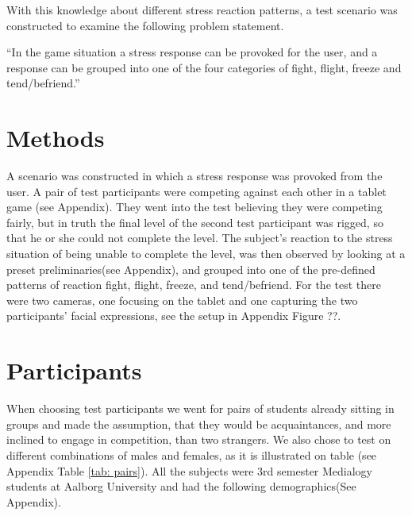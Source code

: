With this knowledge about different stress reaction patterns, a test scenario was constructed to examine the following problem statement.

“In the game situation a stress response can be provoked for the user, and a response can be grouped into one of the four categories of fight, flight, freeze and tend/befriend.”

\section{Methods}
A scenario was constructed in which a stress response was provoked from the user. A pair of test participants were competing against each other in a tablet game (see Appendix). They went into the test believing they were competing fairly, but in truth the final level of the second test participant was rigged, so that he or she could not complete the level. The subject’s reaction to the stress situation of being unable to complete the level, was then observed by looking at a preset preliminaries(see Appendix), and grouped into one of the pre-defined patterns of reaction fight, flight, freeze, and tend/befriend. For the test there were two cameras, one focusing on the tablet and one capturing the two participants’ facial expressions, see the setup in Appendix Figure ??. 

\section{Participants}
When choosing test participants we went for pairs of students already sitting in groups and made the assumption, that they would be acquaintances, and more inclined to engage in competition, than two strangers. We also chose to test on different combinations of males and females, as it is illustrated on table (see Appendix Table \ref{tab: pairs}). All the subjects were 3rd semester Medialogy students at Aalborg University and had the following demographics(See Appendix). 

